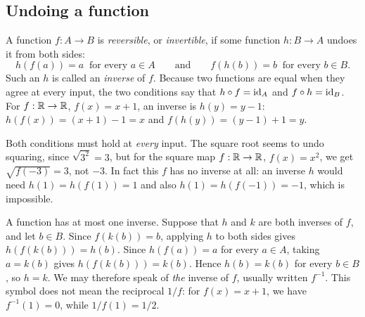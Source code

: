 \subsection*{Undoing a function}
A function $f:A\to B$ is \emph{reversible}, or \emph{invertible}, if some function $h:B\to A$ undoes it from both sides:
\[
h(f(a))=a\ \text{ for every }a\in A\qquad\text{and}\qquad f(h(b))=b\ \text{ for every }b\in B.
\]
Such an $h$ is called an \emph{inverse} of $f$. Because two functions are equal when they agree at every input, the two conditions say that $h\circ f=\operatorname{id}_A$ and $f\circ h=\operatorname{id}_B$. For $f:\mathbb R\to\mathbb R$, $f(x)=x+1$, an inverse is $h(y)=y-1$: $h(f(x))=(x+1)-1=x$ and $f(h(y))=(y-1)+1=y$.

Both conditions must hold at \emph{every} input. The square root seems to undo squaring, since $\sqrt{3^2}=3$, but for the square map $f:\mathbb R\to\mathbb R$, $f(x)=x^2$, we get $\sqrt{f(-3)}=3$, not $-3$. In fact this $f$ has no inverse at all: an inverse $h$ would need $h(1)=h(f(1))=1$ and also $h(1)=h(f(-1))=-1$, which is impossible.

A function has at most one inverse. Suppose that $h$ and $k$ are both inverses of $f$, and let $b\in B$. Since $f(k(b))=b$, applying $h$ to both sides gives $h(f(k(b)))=h(b)$. Since $h(f(a))=a$ for every $a\in A$, taking $a=k(b)$ gives $h(f(k(b)))=k(b)$. Hence $h(b)=k(b)$ for every $b\in B$, so $h=k$. We may therefore speak of \emph{the} inverse of $f$, usually written $f^{-1}$. This symbol does not mean the reciprocal $1/f$: for $f(x)=x+1$, we have $f^{-1}(1)=0$, while $1/f(1)=1/2$.
